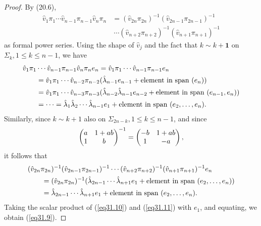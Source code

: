 \documentclass{surv-l}
\theoremstyle{plain}
\theoremstyle{definition}
\numberwithin{equation}{chapter}
\begin{document}
\begin{proof}
By (20.6),
\begin{align*}
\hat{v}_{1}\pi_{1}\cdots\hat{v}_{n-1}\pi_{n-1}\hat{v}_{n}\pi_{n}&=(\hat{v}_{2n}\pi_{2n})^{-1}(\hat{v}_{2n-1}\pi_{2n-1})^{-1}\\
&\ \cdots(\hat{v}_{n+2}\pi_{n+2})^{-1}(\hat{v}_{n+1}\pi_{n+1})^{-1}
\end{align*}
as formal power series. Using the shape of $\hat{v}_{j}$ and the fact that $k\sim k+\mathbf{1}$ on $\Sigma_{k}, 1\leq k\leq n-1$, we have
\begin{align}\label{eq31.10}
\hat{v}_{1}\pi_{1}&\cdots \hat{v}_{n-1}\pi_{n-1}\hat{v}_{n}\pi_{n}e_{n}=\hat{v}_{1}\pi_{1}\cdots\hat{v}_{n-1}\pi_{n-1}e_{n}\\ \notag
&=\hat{v}_{1}\pi_{1}\cdots\hat{v}_{n-2}\pi_{n-2}(\hat{\lambda}_{n-1}e_{n-1}+\text{element in span }(e_{n}))\\ \notag
&=\hat{v}_{1}\pi_{1}\cdots \hat{v}_{n-3}\pi_{ n-3}(\hat{\lambda}_{n-2}\hat{\lambda}_{n-1}e_{n-2}+\text{element in span }(e_{n-1}, e_{n}))\\ \notag
&=\cdots =\hat{\lambda}_{1}\hat{\lambda}_{2}\cdots \hat{\lambda}_{n-1}e_{1}+ \text{element in span } (e_{2}, \ldots, e_{n}).
\end{align}
Similarly, since $k\sim k+1$ also on ${\Sigma}_{2n-k}, 1\leq k\leq n-1$, and since
\begin{equation*}
\left(\begin{array}{@{}cc@{}}
a & 1+ab\\
1 & b
\end{array}\right)^{-1}=\left(\begin{array}{@{}cc@{}}
-b & 1+ab\\
1 & -a
\end{array}\right),
\end{equation*}
it follows that
\begin{align}\label{eq31.11}
&(\hat{v}_{2n}\pi_{2n})^{-1}(\hat{v}_{2n-1}\pi_{2n-1})^{-1}\cdots (\hat{v}_{n+2}\pi_{n+2})^{-1}(\hat{v}_{n+1}\pi_{n+1})^{-1}e_{n}\\ \notag
&\qquad=(\hat{v}_{2n}\pi_{2n})^{-1}(\hat{\lambda}_{2n-1}\cdots \hat{\lambda}_{n+1}e_{1}+ \text{element in span } (e_{2}, \ldots, e_{n}))\\ \notag
&\qquad=\hat{\lambda}_{2n-1}\cdots \hat{\lambda}_{n+1}e_{1}+ \text{element in span }(e_{2},\ldots,e_{n}).
\end{align}
Taking the scalar product of (\ref{eq31.10}) and (\ref{eq31.11}) with $e_{1}$, and equating, we obtain (\ref{eq31.9}).\quad
\end{proof}
\end{document}
